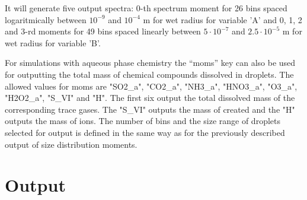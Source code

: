 \documentclass[11pt]{article}
\begin{document}
\begin{itemize}
\vspace{0.35cm}
   It will generate five output spectra:
      0-th spectrum moment for 26 bins spaced logaritmically 
        between $10^{-9}$ and $10^{-4}$ m for wet radius for variable 'A' and 
      0, 1, 2 and 3-rd moments for 49 bins spaced linearly 
        between $5\cdot10^{-7}$ and $2.5\cdot10^{-5}$ m for wet radius for variable 'B'.

   \vspace{1.5em}
   For simulations with aqueous phase chemistry the ``moms'' key can also be used 
     for outputting the total mass of chemical compounds dissolved in droplets.
   The allowed values for moms are "SO2\_a", "CO2\_a", "NH3\_a", "HNO3\_a", "O3\_a", "H2O2\_a", "S\_VI" and "H".
   The first six output the total dissolved mass of the corresponding trace gases.
   The "S\_VI" outputs the mass of created  and the "H" outputs the mass of  ions.
   The number of bins and the size range of droplets selected for output 
     is defined in the same way as for the previously described output of size distribution moments.

\end{itemize}

\section{Output}
\end{document}
